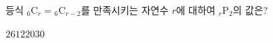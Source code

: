 등식 ${}_6\mathrm{C}_r={}_6\mathrm{C}_{r-2}$를 만족시키는 자연수 $r$에 대하여 ${}_r\mathrm{P}_2$의 값은?
\begin{choices32}{$2$}{$6$}{$12$}{$20$}{$30$}\end{choices32}

